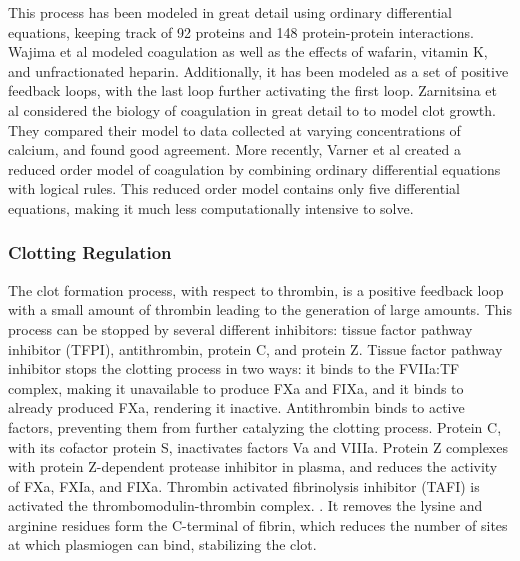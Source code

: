 \documentclass[12pt]{article}
\begin{document}
This process has been modeled in great detail using ordinary differential equations, keeping track of 92 proteins and 148 protein-protein interactions. \cite{luan2007computationally} Wajima et al modeled coagulation as well as the effects of wafarin, vitamin K, and unfractionated heparin.\cite{wajima2009comprehensive} Additionally, it has been modeled as a set of positive feedback loops, with the last loop further activating the first loop. \cite{beltrami1995mathematical} Zarnitsina et al considered the biology of coagulation in great detail to to model clot growth. \cite{zarnitsina1996mathematical} They compared their model to data collected at varying concentrations of calcium, and found good agreement. More recently, Varner et al created a reduced order model of coagulation by combining ordinary differential equations with logical rules. \cite{sagar2015dynamic} This reduced order model contains only five differential equations, making it much less computationally intensive to solve. 
\subsubsection*{Clotting Regulation}
The clot formation process, with respect to thrombin, is a positive feedback loop with a small amount of thrombin leading to the generation of large amounts. This process can be stopped by several different inhibitors: tissue factor pathway inhibitor (TFPI), antithrombin, protein C, and protein Z.  
Tissue factor pathway inhibitor stops the clotting process in two ways: it binds to the FVIIa:TF complex, making it unavailable to produce FXa and FIXa, and it binds to already produced FXa, rendering it inactive. \cite{lwaleed2006tissue} Antithrombin binds to active factors, preventing them from further catalyzing the clotting process. \cite{olson1994regulation} Protein C, with its cofactor protein S, inactivates factors Va and VIIIa. \citep{esmon1987anticoagulation} Protein Z complexes with protein Z-dependent protease inhibitor in plasma, and reduces the activity of FXa, FXIa, and FIXa. \citep {corral2007protein}
Thrombin activated fibrinolysis inhibitor (TAFI) is activated the thrombomodulin-thrombin complex. \citep{chapin2015fibrinolysis}. It removes the lysine and arginine residues form the C-terminal of fibrin, which reduces the number of sites at which plasmiogen can bind, stabilizing the clot. 
\end{document}
